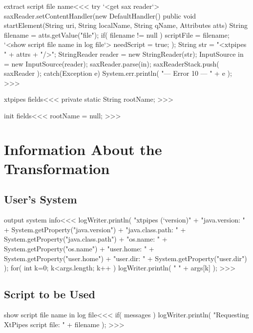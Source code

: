 \documentclass{article}
\begin{document}
\<extract script file name\><<<
try {
   `<get sax reader`>
   saxReader.setContentHandler(new DefaultHandler() {
      public void startElement(String uri, String localName,
         String qName, Attributes atts) {
         String filename = atts.getValue("file");
         if( filename != null ){
            scriptFile = filename;
            `<show script file name in log file`>
            needScript = true;
      }  }
   });
   String str = "<xtpipes " + attrs + "/>";
   StringReader reader = new StringReader(str);
   InputSource in = new InputSource(reader);
   saxReader.parse(in);
   saxReaderStack.push( saxReader );
} catch(Exception e){
   System.err.println( "--- Error 10 --- " + e );
}
>>>







\<xtpipes fields\><<<
private static String  rootName;
>>>


\<init fields\><<<
rootName = null;
>>>




\section{Information About the Transformation}

\subsection{User's System}



\<output system info\><<<
logWriter.println(
     "xtpipes (`version)"
     + "\n java.version: "    + System.getProperty("java.version")
     + "\n java.class.path: " + System.getProperty("java.class.path")
     + "\n os.name: "         + System.getProperty("os.name")
     + "\n user.home: "       + System.getProperty("user.home")
     + "\n user.dir: "        + System.getProperty("user.dir")
);
for( int k=0; k<args.length; k++ ){
  logWriter.println( "     " + args[k] );
}
>>>

\subsection{Script to be Used}


\<show script file name in log file\><<<
if( messages ){
   logWriter.println(
      "Requesting XtPipes script file: "
      + filename );
}
>>>
\end{document}
